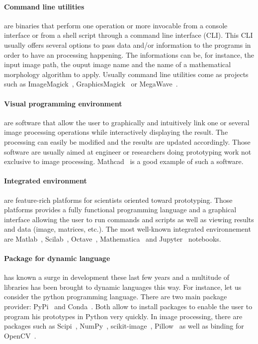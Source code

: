 \paragraph{Command line utilities} are binaries that perform one operation or more invocable from a console interface or
from a shell script through a command line interface (CLI). This CLI usually offers several options to pass data and/or
information to the programs in order to have an processing happening. The informations can be, for instance, the input
image path, the ouput image name and the name of a mathematical morphology algorithm to apply. Usually command line
utilities come as projects such as ImageMagick~\parencite{imagemagick.2021},
GraphicsMagick~\parencite{graphicsmagick.2021} or MegaWave~\parencite{froment.2012.megawave,froment.2004.megawave2}.

\paragraph{Visual programming environment} are software that allow the user to graphically and intuitively link one or
several image processing operations while interactively displaying the result. The processing can easily be modified and
the results are updated accordingly. Those software are usually aimed at engineer or researchers doing prototyping work
not exclusive to image processing. Mathcad~\parencite{ptc.2019.mathcad} is a good example of such a software.

\paragraph{Integrated environment} are feature-rich platforms for scientists oriented toward prototyping. Those
platforms provides a fully functional programming language and a graphical interface allowing the user to run commands
and scripts as well as viewing results and data (image, matrices, etc.). The most well-known integrated environnement
are Matlab~\parencite{mathworks.2020.matlab}, Scilab~\parencite{scilab.2020}, Octave~\parencite{gnu.2021.octave},
Mathematica~\parencite{wolfram.2020.mathematica} and Jupyter~\parencite{kluyver.2016.jupyter} notebooks.

\paragraph{Package for dynamic language} has known a surge in development these last few years and a multitude of
libraries has been brought to dynamic languages this way. For instance, let us consider the python programming language.
There are two main package provider: PyPi~\parencite{pypi.2021} and Conda~\parencite{anaconda.2020}. Both allow to
install packages to enable the user to program his prototypes in Python very quickly. In image processing, there are
packages such as Scipi~\parencite{jones.2006.scipy}, NumPy~\parencite{oliphant.2006.numpy},
scikit-image~\parencite{vanderWalts.2014.scikit-image}, Pillow~\parencite{clark.2021.pillow} as well as binding for
OpenCV~\parencite{bradski.2000.opencv}.

